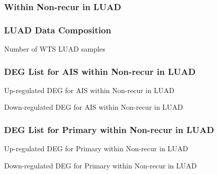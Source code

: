 \documentclass{beamer}
\begin{document}
    \subsubsection{Within Non-recur in LUAD}
    \begin{frame}
        \frametitle{LUAD Data Composition}

        \begin{table}
            \caption{Number of WTS LUAD samples}
            
        \end{table}
    \end{frame}

    \begin{frame}
        \frametitle{DEG List for AIS within Non-recur in LUAD}

        \begin{table}
            \caption{Up-regulated DEG for AIS within Non-recur in LUAD}
            
        \end{table}

        \begin{table}
            \caption{Down-regulated DEG for AIS within Non-recur in LUAD}
            
        \end{table}
    \end{frame}

    \begin{frame}
        \frametitle{DEG List for Primary within Non-recur in LUAD}

        \begin{table}
            \caption{Up-regulated DEG for Primary within Non-recur in LUAD}
            
        \end{table}

        \begin{table}
            \caption{Down-regulated DEG for Primary within Non-recur in LUAD}
            
        \end{table}
    \end{frame}
\end{document}
